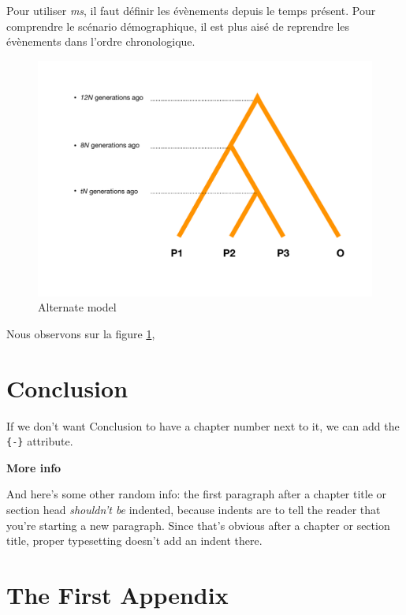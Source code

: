 \documentclass[12pt,twoside]{reedthesis}
\theoremstyle{definition}
\theoremstyle{definition}
\theoremstyle{remark}
\begin{document}
  Pour utiliser \emph{ms}, il faut définir les évènements depuis le temps
  présent. Pour comprendre le scénario démographique, il est plus aisé de
  reprendre les évènements dans l'ordre chronologique.
  
  \begin{figure}
  \includegraphics[scale=0.5]{figure/alternate} \caption{Alternate model}\label{fig:alternate}
  \end{figure}
  
  Nous observons sur la figure \ref{fig:alternate},
  
  \chapter*{Conclusion}\label{conclusion}
  
  If we don't want Conclusion to have a chapter number next to it, we can
  add the \texttt{\{-\}} attribute.
  
  \textbf{More info}
  
  And here's some other random info: the first paragraph after a chapter
  title or section head \emph{shouldn't be} indented, because indents are
  to tell the reader that you're starting a new paragraph. Since that's
  obvious after a chapter or section title, proper typesetting doesn't add
  an indent there.
  
  \appendix
  
  \chapter{The First Appendix}\label{the-first-appendix}
  
\end{document}
